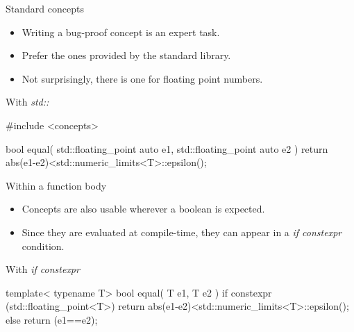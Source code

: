 \begin{frame}[fragile]
    \begin{block}{Standard concepts}
      \begin{itemize}
        \item Writing a bug-proof concept is an expert task.
        \item Prefer the ones provided by the standard library.
        \item Not surprisingly, there is one for floating point numbers.
      \end{itemize}
    \end{block}
    \begin{exampleblock}{With {\it std::}}
      \scriptsize
      \begin{cppcode*}{}
      #include <concepts>

      bool equal( std::floating_point auto e1, std::floating_point auto e2 )
      { return abs(e1-e2)<std::numeric_limits<T>::epsilon(); }
      \end{cppcode*}
    \end{exampleblock}
\end{frame}

\begin{frame}[fragile]
    \begin{block}{Within a function body}
      \begin{itemize}
        \item Concepts are also usable wherever a boolean is expected.
        \item Since they are evaluated at compile-time, they can appear in a {\it if constexpr} condition.
      \end{itemize}
    \end{block}
    \begin{exampleblock}{With {\it if constexpr}}
      \scriptsize
      \begin{cppcode*}{}
      template< typename T>
      bool equal( T e1, T e2 )
      {
        if constexpr (std::floating_point<T>)
        { return abs(e1-e2)<std::numeric_limits<T>::epsilon(); }
        else
        { return (e1==e2); }
      }
      \end{cppcode*}
    \end{exampleblock}
\end{frame}

